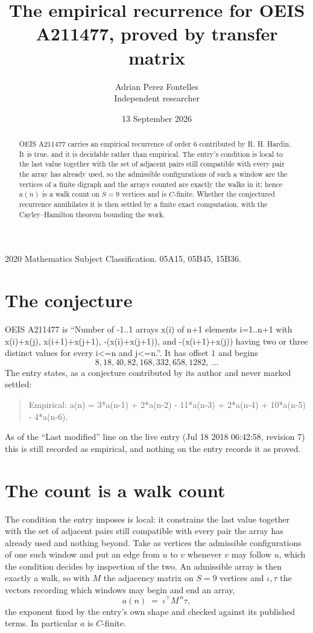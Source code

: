 \documentclass[11pt,a4paper]{article}
\title{The empirical recurrence for OEIS A211477, proved by transfer matrix}
\author{Adrian Perez Fontelles\\ \small Independent researcher}
\date{13 September 2026}
\theoremstyle{plain}
\theoremstyle{definition}
\begin{document}
\maketitle

\begin{abstract}
OEIS A211477 carries an empirical recurrence of order $6$ contributed by R. H. Hardin. It is
true, and it is decidable rather than empirical. The entry's condition is local to the last value together with the set of adjacent pairs still compatible with every pair the array has already used, so
the admissible configurations of such a window are the vertices of a finite digraph and the
arrays counted are exactly the walks in it; hence $a(n)$ is a walk count on $S=9$ vertices
and is $C$-finite. Whether the conjectured recurrence annihilates it is then settled by a
finite exact computation, with the Cayley--Hamilton theorem bounding the work.
\end{abstract}

\noindent\small 2020 Mathematics Subject Classification. 05A15, 05B45, 15B36.\normalsize

\section{The conjecture}

OEIS A211477 is ``Number of -1..1 arrays x(i) of n+1 elements i=1..n+1 with x(i)+x(j), x(i+1)+x(j+1), -(x(i)+x(j+1)), and -(x(i+1)+x(j)) having two or three distinct values for every i<=n and j<=n.''. It has offset $1$ and begins
\[
8, 18, 40, 82, 168, 332, 658, 1282,\ \dots
\]
The entry states, as a conjecture contributed by its author and never marked settled:
\begin{quote}
Empirical: a(n) = 3*a(n-1) + 2*a(n-2) - 11*a(n-3) + 2*a(n-4) + 10*a(n-5) - 4*a(n-6).
\end{quote}
As of the ``Last modified'' line on the live entry (Jul 18 2018 06:42:58, revision 7) this is still
recorded as empirical, and nothing on the entry records it as proved.

\section{The count is a walk count}

The condition the entry imposes is local: it constrains the last value together with the set of adjacent pairs still compatible with every pair the array has already used and nothing beyond. Take as
vertices the admissible configurations of one such window and put an edge from $u$ to $v$
whenever $v$ may follow $u$, which the condition decides by inspection of the two. An
admissible array is then exactly a walk, so with $M$ the adjacency matrix on $S=9$ vertices
and $\iota,\tau$ the vectors recording which windows may begin and end an array,
\[
a(n)\;=\;\iota^{\!\top}M^{\,n}\tau ,
\]
the exponent fixed by the entry's own shape and checked against its published terms. In
particular $a$ is $C$-finite.
\end{document}
